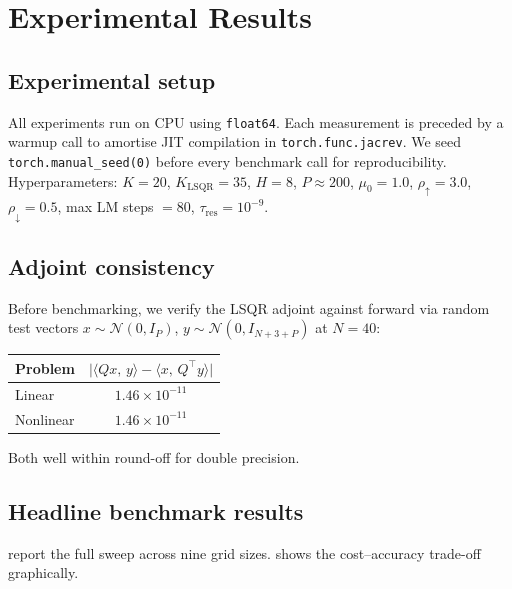 \documentclass[11pt,a4paper]{article}
\newcommand{\inner}[2]{\langle #1,\, #2\rangle}
\begin{document}
\section{Experimental Results}
\label{sec:results}

\subsection{Experimental setup}

All experiments run on CPU using \texttt{float64}. Each measurement is preceded
by a warmup call to amortise JIT compilation in \texttt{torch.func.jacrev}. We
seed \texttt{torch.manual\_seed(0)} before every benchmark call for
reproducibility. Hyperparameters:
$K = 20$, $K_{\mathrm{LSQR}} = 35$, $H = 8$, $P \approx 200$,
$\mu_{0} = 1.0$, $\rho_{\uparrow} = 3.0$, $\rho_{\downarrow} = 0.5$,
max LM steps $= 80$, $\tau_{\mathrm{res}} = 10^{-9}$.

\subsection{Adjoint consistency}

Before benchmarking, we verify the LSQR adjoint against forward via random
test vectors $x\sim\mathcal{N}(0, I_{P})$, $y\sim\mathcal{N}(0, I_{N+3+P})$ at
$N=40$:

\medskip
\begin{center}
\begin{tabular}{lc}
\toprule
Problem & $\bigl|\inner{Q x}{y} - \inner{x}{Q^{\!\top}y}\bigr|$ \\
\midrule
Linear    & $1.46\times 10^{-11}$ \\
Nonlinear & $1.46\times 10^{-11}$ \\
\bottomrule
\end{tabular}
\end{center}
\medskip

\noindent Both well within round-off for double precision.

\subsection{Headline benchmark results}

 report the full sweep across nine
grid sizes.  shows the cost--accuracy trade-off graphically.
\end{document}
